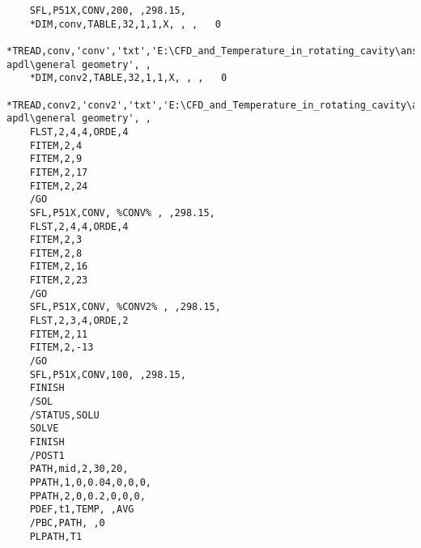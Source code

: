 \begin{verbatim}
    SFL,P51X,CONV,200, ,298.15,
    *DIM,conv,TABLE,32,1,1,X, , ,   0
    *TREAD,conv,'conv','txt','E:\CFD_and_Temperature_in_rotating_cavity\ansys apdl\general geometry', ,
    *DIM,conv2,TABLE,32,1,1,X, , ,   0
    *TREAD,conv2,'conv2','txt','E:\CFD_and_Temperature_in_rotating_cavity\ansys apdl\general geometry', ,
    FLST,2,4,4,ORDE,4
    FITEM,2,4
    FITEM,2,9
    FITEM,2,17
    FITEM,2,24
    /GO
    SFL,P51X,CONV, %CONV% , ,298.15,
    FLST,2,4,4,ORDE,4
    FITEM,2,3
    FITEM,2,8
    FITEM,2,16
    FITEM,2,23
    /GO
    SFL,P51X,CONV, %CONV2% , ,298.15,
    FLST,2,3,4,ORDE,2
    FITEM,2,11
    FITEM,2,-13
    /GO
    SFL,P51X,CONV,100, ,298.15,
    FINISH
    /SOL
    /STATUS,SOLU
    SOLVE
    FINISH
    /POST1
    PATH,mid,2,30,20,
    PPATH,1,0,0.04,0,0,0,
    PPATH,2,0,0.2,0,0,0,
    PDEF,t1,TEMP, ,AVG
    /PBC,PATH, ,0
    PLPATH,T1
    \end{verbatim}
    \normalsize
